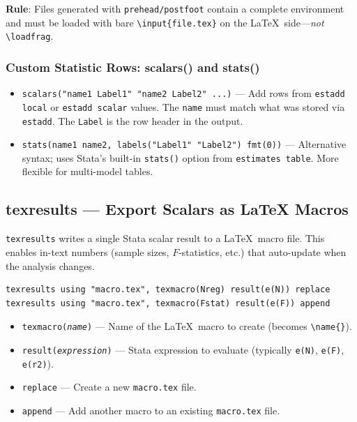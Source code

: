 \documentclass[11pt]{article}
\numberwithin{table}{section}
\begin{document}
\textbf{Rule}: Files generated with \texttt{prehead/postfoot} contain a complete environment and must be loaded with bare \texttt{\textbackslash input\{file.tex\}} on the \LaTeX\ side---\emph{not} \texttt{\textbackslash loadfrag}.

\subsubsection{Custom Statistic Rows: scalars() and stats()}

\begin{itemize}
    \item \texttt{scalars("name1 Label1" "name2 Label2" ...)} --- Add rows from \texttt{estadd local} or \texttt{estadd scalar} values. The \texttt{name} must match what was stored via \texttt{estadd}. The \texttt{Label} is the row header in the output.
    \item \texttt{stats(name1 name2, labels("Label1" "Label2") fmt(0))} --- Alternative syntax; uses Stata's built-in \texttt{stats()} option from \texttt{estimates table}. More flexible for multi-model tables.
\end{itemize}

\subsection{texresults --- Export Scalars as LaTeX Macros}

\texttt{texresults} writes a single Stata scalar result to a \LaTeX\ macro file. This enables in-text numbers (sample sizes, $F$-statistics, etc.) that auto-update when the analysis changes.

\begin{lstlisting}[style=stata]
texresults using "macro.tex", texmacro(Nreg) result(e(N)) replace
texresults using "macro.tex", texmacro(Fstat) result(e(F)) append
\end{lstlisting}

\begin{itemize}
    \item \texttt{texmacro(\emph{name})} --- Name of the \LaTeX\ macro to create (becomes \texttt{\textbackslash name\{\}}).
    \item \texttt{result(\emph{expression})} --- Stata expression to evaluate (typically \texttt{e(N)}, \texttt{e(F)}, \texttt{e(r2)}).
    \item \texttt{replace} --- Create a new \texttt{macro.tex} file.
    \item \texttt{append} --- Add another macro to an existing \texttt{macro.tex} file.
\end{itemize}
\end{document}
